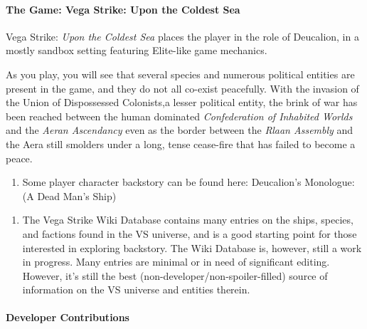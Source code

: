 \documentclass{article}
\begin{document}
\paragraph{The Game: Vega Strike: Upon the Coldest Sea}

Vega Strike: \textit{Upon the Coldest Sea} places the player in the role of Deucalion, in a mostly sandbox setting featuring Elite-like game mechanics.

As you play, you will see that several species and numerous political entities are present in the game, and they do not all co-exist peacefully. With the invasion of the Union of Dispossessed Colonists,a lesser political entity, the brink of war has been reached between the human dominated \textit{Confederation of Inhabited Worlds} and the\textit{ Aeran Ascendancy} even as the border between the \textit{Rlaan Assembly} and the Aera still smolders under a long, tense cease-fire that has failed to become a peace. 

\begin{enumerate}
\item  Some player character backstory can be found here: Deucalion's Monologue: (A Dead Man's Ship)
\end{enumerate}



\begin{enumerate}
\item  The Vega Strike Wiki Database contains many entries on the ships, species, and factions found in the VS universe, and is a good starting point for those interested in exploring backstory. The Wiki Database is, however, still a work in progress. Many entries are minimal or in need of significant editing. However, it's still the best (non-developer/non-spoiler-filled) source of information on the VS universe and entities therein.
\end{enumerate}


\paragraph{Developer Contributions}
\end{document}
